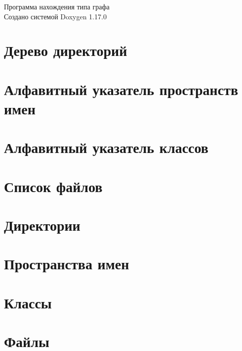 \documentclass[twoside]{book}
\newcommand{\+}{\discretionary{\mbox{\scriptsize$\hookleftarrow$}}{}{}}
\newcommand{\clearemptydoublepage}{%
    \newpage{\pagestyle{empty}\cleardoublepage}%
  }
\begin{document}
  \raggedbottom
    \hypersetup{pageanchor=false,
                bookmarksnumbered=true,
                pdfencoding=unicode
               }
  \begin{titlepage}
  \vspace*{7cm}
  \begin{center}%
  {\Large Программа нахождения типа графа}\\
  \vspace*{1cm}
  {\large Создано системой Doxygen 1.17.0}\\
  \end{center}
  \end{titlepage}
  \clearemptydoublepage
  \tableofcontents
  \clearemptydoublepage
  \hypersetup{pageanchor=true}

\chapter{Дерево директорий}

\chapter{Алфавитный указатель пространств имен}

\chapter{Алфавитный указатель классов}

\chapter{Список файлов}

\chapter{Директории}





\chapter{Пространства имен}

\chapter{Классы}



\chapter{Файлы}








  \backmatter
  \newpage
  \clearemptydoublepage
  \printindex
\end{document}
